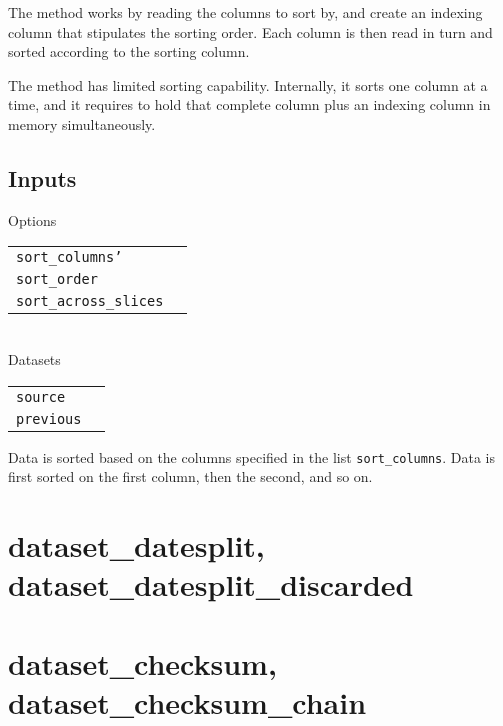 The method works by reading the columns to sort by, and create an
indexing column that stipulates the sorting order.  Each column is
then read in turn and sorted according to the sorting column.

The method has limited sorting capability.  Internally, it sorts one
column at a time, and it requires to hold that complete column plus an
indexing column in memory simultaneously.

\subsection{Inputs}

\noindent Options\\

\begin{tabular}{ll}
  \texttt{sort\_columns'} & \\    %
  \texttt{sort\_order} & \\        %
  \texttt{sort\_across\_slices} & \\%
\end{tabular}\\

\noindent Datasets\\

\begin{tabular}{ll}
  \texttt{source} & \\
  \texttt{previous} & \\
\end{tabular}

Data is sorted based on the columns specified in the list
\texttt{sort\_columns}.  Data is first sorted on the first column,
then the second, and so on.





\clearpage
\section{dataset\_datesplit, dataset\_datesplit\_discarded}

\clearpage
\section{dataset\_checksum, dataset\_checksum\_chain}


